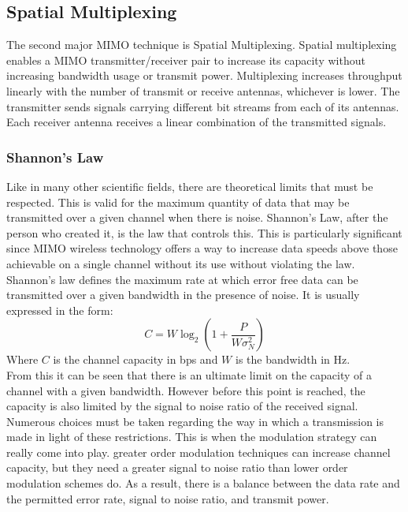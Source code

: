 \subsection{Spatial Multiplexing}
\label{subsection:MIMO-Multiplexing}
The second major MIMO technique is Spatial Multiplexing. Spatial multiplexing enables a MIMO transmitter/receiver pair to increase its capacity without increasing bandwidth usage or transmit power. Multiplexing increases throughput linearly with the number of transmit or receive antennas, whichever is lower. The transmitter sends signals carrying different bit streams from each of its antennas. Each receiver antenna receives a linear combination of the transmitted signals.
\subsubsection{Shannon's Law}
Like in many other scientific fields, there are theoretical limits that must be respected. This is valid for the maximum quantity of data that may be transmitted over a given channel when there is noise. Shannon's Law, after the person who created it, is the law that controls this. This is particularly significant since MIMO wireless technology offers a way to increase data speeds above those achievable on a single channel without its use without violating the law. \\
Shannon's law defines the maximum rate at which error free data can be transmitted over a given bandwidth in the presence of noise. It is usually expressed in the form:
\begin{equation}
    \label{eq:Shannon rate law}
    C = W \log_2 \left( 1 + \frac{P}{W \sigma_N^2} \right)
\end{equation}
Where $C$ is the channel capacity in bps and $W$ is the bandwidth in Hz.\\

From this it can be seen that there is an ultimate limit on the capacity of a channel with a given bandwidth. However before this point is reached, the capacity is also limited by the signal to noise ratio of the received signal.\\

Numerous choices must be taken regarding the way in which a transmission is made in light of these restrictions. This is when the modulation strategy can really come into play. greater order modulation techniques can increase channel capacity, but they need a greater signal to noise ratio than lower order modulation schemes do. As a result, there is a balance between the data rate and the permitted error rate, signal to noise ratio, and transmit power.
